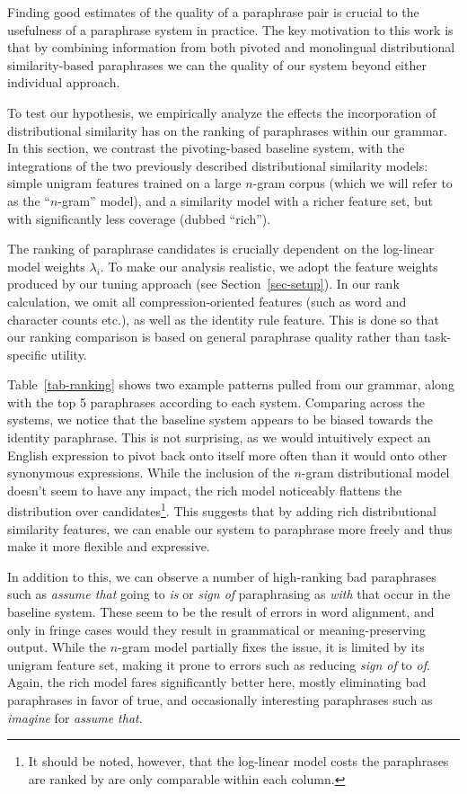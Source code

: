 \documentclass[11pt]{article}
\begin{document}
Finding good estimates of the quality of a paraphrase pair is crucial
to the usefulness of a paraphrase system in practice. The key
motivation to this work is that by combining information from both
pivoted and monolingual distributional similarity-based paraphrases we
can the quality of our system beyond either individual approach.

To test our hypothesis, we empirically analyze the effects the
incorporation of distributional similarity has on the ranking of
paraphrases within our grammar. In this section, we contrast the
pivoting-based baseline system, with the integrations of the two
previously described distributional similarity models: simple unigram
features trained on a large $n$-gram corpus (which we will refer to as
the ``$n$-gram'' model), and a similarity model with a richer feature
set, but with significantly less coverage (dubbed ``rich'').

The ranking of paraphrase candidates is crucially dependent on the
log-linear model weights $\lambda_i$. To make our analysis realistic,
we adopt the feature weights produced by our tuning approach (see
Section~\ref{sec-setup}). In our rank calculation, we omit all
compression-oriented features (such as word and character counts
etc.), as well as the identity rule feature. This is done so that our
ranking comparison is based on general paraphrase quality rather than
task-specific utility.

Table~\ref{tab-ranking} shows two example patterns pulled from our
grammar, along with the top 5 paraphrases according to each
system. Comparing across the systems, we notice that the baseline
system appears to be biased towards the identity paraphrase. This is
not surprising, as we would intuitively expect an English expression
to pivot back onto itself more often than it would onto other
synonymous expressions. While the inclusion of the $n$-gram
distributional model doesn't seem to have any impact, the rich model
noticeably flattens the distribution over candidates\footnote{It
  should be noted, however, that the log-linear model costs the
  paraphrases are ranked by are only comparable within each
  column.}. This suggests that by adding rich distributional
similarity features, we can enable our system to paraphrase more
freely and thus make it more flexible and expressive.

In addition to this, we can observe a number of high-ranking bad
paraphrases such as \emph{assume that} going to \emph{is} or
\emph{sign of} paraphrasing as \emph{with} that occur in the baseline
system. These seem to be the result of errors in word alignment, and
only in fringe cases would they result in grammatical or
meaning-preserving output. While the $n$-gram model partially fixes
the issue, it is limited by its unigram feature set, making it prone
to errors such as reducing \emph{sign of} to \emph{of}. Again, the
rich model fares significantly better here, mostly eliminating bad
paraphrases in favor of true, and occasionally interesting paraphrases
such as \emph{imagine} for \emph{assume that}.
\end{document}
